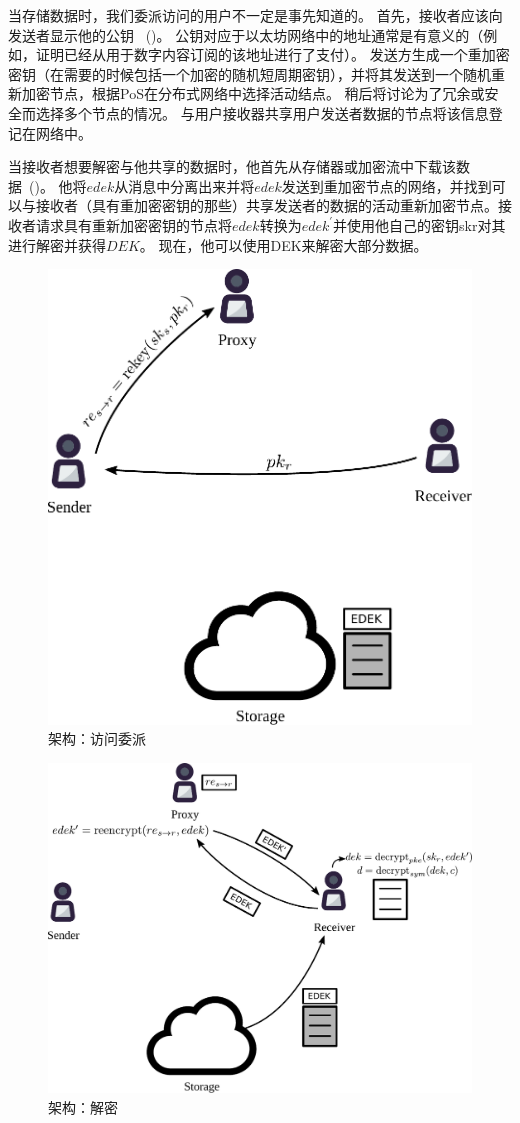 \documentclass[longbibliography,nofootinbib]{revtex4-1}
\begin{document}
当存储数据时，我们委派访问的用户不一定是事先知道的。 首先，接收者应该向发送者显示他的公钥 ~()。 公钥对应于以太坊网络中的地址通常是有意义的（例如，证明已经从用于数字内容订阅的该地址进行了支付）。 发送方生成一个重加密密钥（在需要的时候包括一个加密的随机短周期密钥），并将其发送到一个随机重新加密节点，根据PoS在分布式网络中选择活动结点。 稍后将讨论为了冗余或安全而选择多个节点的情况。 与用户接收器共享用户发送者数据的节点将该信息登记在网络中。

当接收者想要解密与他共享的数据时，他首先从存储器或加密流中下载该数据~()。 他将$edek$从消息中分离出来并将$edek$发送到重加密节点的网络，并找到可以与接收者（具有重加密密钥的那些）共享发送者的数据的活动重新加密节点。接收者请求具有重新加密密钥的节点将$edek$转换为$edek^{\prime}$并使用他自己的密钥skr对其进行解密并获得$DEK$。 现在，他可以使用DEK来解密大部分数据。

\begin{figure}
\centering
    \includegraphics[width=0.4\columnwidth]{pdf/delegate.pdf}
    \caption{架构：访问委派}
    \label{fig:arch-delegate}
\end{figure}

\begin{figure}
\centering
    \includegraphics[width=0.6\columnwidth]{pdf/decrypt.pdf}
    \caption{架构：解密}
    \label{fig:arch-decrypt}
\end{figure}
\end{document}

